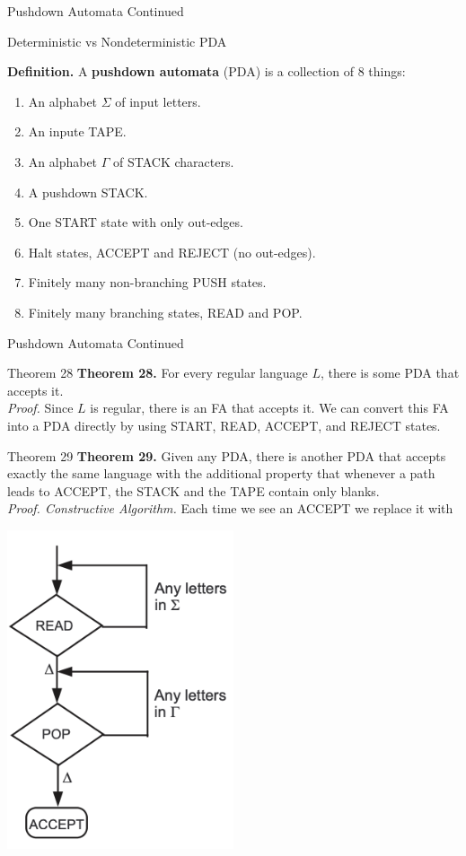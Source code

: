 \documentclass{article}
\begin{document}
\begin{multicols*}{3}
\begin{blackbox}{Pushdown Automata Continued}
\begin{bluebox}{Deterministic vs Nondeterministic PDA}
    \end{bluebox}
    \textbf{Definition.} A \textbf{pushdown automata} (PDA) is a collection of 8 things:
    \begin{enumerate}[leftmargin=10pt]
        \item An alphabet $\Sigma$ of input letters.
        \item An inpute TAPE.
        \item An alphabet $\Gamma$ of STACK characters.
        \item A pushdown STACK.
        \item One START state with only out-edges.
        \item Halt states, ACCEPT and REJECT (no out-edges).
        \item Finitely many non-branching PUSH states.
        \item Finitely many branching states, READ and POP.
    \end{enumerate}
\end{blackbox}
\begin{blackbox}{Pushdown Automata Continued}
    \begin{redbox}{Theorem 28}
        \textbf{Theorem 28.} For every regular language $L$, there is some PDA that accepts it.\\[1ex]
        \textit{Proof.} Since $L$ is regular, there is an FA that accepts it. We can convert this FA into a PDA directly by using START, READ, ACCEPT, and REJECT states.
    \end{redbox}
    \begin{brownbox}{Theorem 29}
        \textbf{Theorem 29.} Given any PDA, there is another PDA that accepts exactly the same language with the additional property that whenever a path leads to ACCEPT, the STACK and the TAPE contain only blanks.\\[1ex]
        \textit{Proof. Constructive Algorithm.} Each time we see an ACCEPT we replace it with
        \begin{center}
            \includegraphics[width=0.5\textwidth]{t29.png}

\end{center}
\end{brownbox}
\end{blackbox}
\end{multicols*}
\end{document}
